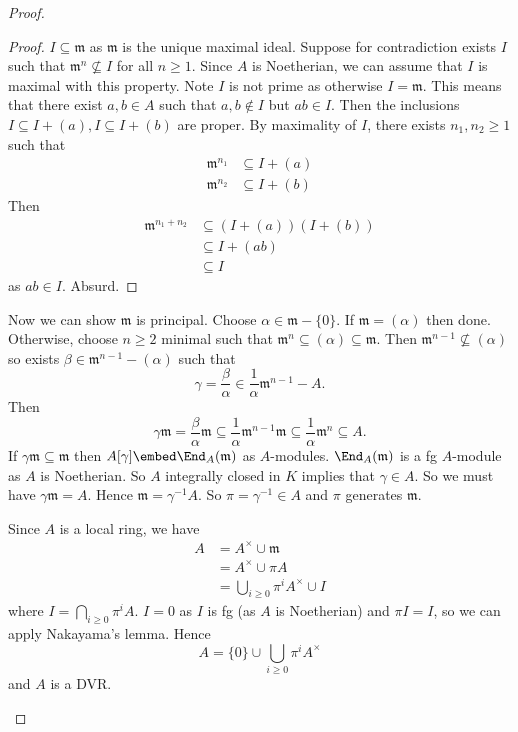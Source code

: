 \documentclass[a4paper]{article}
\begin{document}
\begin{proof}
\begin{itemize}
    \begin{proof}
      \(I \subseteq \mathfrak m\) as \(\mathfrak m\) is the unique maximal ideal. Suppose for contradiction exists \(I\) such that \(\mathfrak m^n \nsubseteq I\) for all \(n \geq 1\). Since \(A\) is Noetherian, we can assume that \(I\) is maximal with this property. Note \(I\) is not prime as otherwise \(I = \mathfrak m\). This means that there exist \(a, b \in A\) such that \(a, b \notin I\) but \(ab \in I\). Then the inclusions \(I \subseteq I + (a), I \subseteq I + (b)\) are proper. By maximality of \(I\), there exists \(n_1, n_2 \geq 1\) such that
      \begin{align*}
        \mathfrak m^{n_1} &\subseteq I + (a) \\
        \mathfrak m^{n_2} &\subseteq I + (b)
      \end{align*}
      Then
      \begin{align*}
        \mathfrak m^{n_1 + n_2} &\subseteq (I + (a)) (I + (b)) \\
                                &\subseteq I + (ab) \\
                                &\subseteq I
      \end{align*}
      as \(ab \in I\). Absurd.
    \end{proof}
    Now we can show \(\mathfrak m\) is principal. Choose \(\alpha \in \mathfrak m - \{0\}\). If \(\mathfrak m = (\alpha)\) then done. Otherwise, choose \(n \geq 2\) minimal such that \(\mathfrak m^n \subseteq (\alpha) \subseteq \mathfrak m\). Then \(\mathfrak m^{n - 1} \nsubseteq (\alpha)\) so exists \(\beta \in \mathfrak m^{n - 1} - (\alpha)\) such that
    \[
      \gamma = \frac{\beta}{\alpha} \in \frac{1}{\alpha} \mathfrak m^{n - 1} - A.
    \]
    Then
    \[
      \gamma \mathfrak m = \frac{\beta}{\alpha} \mathfrak m \subseteq \frac{1}{\alpha} \mathfrak m^{n - 1} \mathfrak m \subseteq \frac{1}{\alpha} \mathfrak m^n \subseteq A.
    \]
    If \(\gamma \mathfrak m \subseteq \mathfrak m\) then \(A[\gamma] \embed \End_A(\mathfrak m)\) as \(A\)-modules. \(\End_A(\mathfrak m)\) is a fg \(A\)-module as \(A\) is Noetherian. So \(A\) integrally closed in \(K\) implies that \(\gamma \in A\). So we must have \(\gamma \mathfrak m = A\). Hence \(\mathfrak m = \gamma^{-1} A\). So \(\pi = \gamma^{-1} \in A\) and \(\pi\) generates \(\mathfrak m\).

    Since \(A\) is a local ring, we have
    \begin{align*}
      A &= A^\times \cup \mathfrak m \\
        &= A^\times \cup \pi A \\
        &= \bigcup_{i \geq 0} \pi^i A^\times \cup I
    \end{align*}
    where \(I = \bigcap_{i \geq 0} \pi^i A\). \(I = 0\) as \(I\) is fg (as \(A\) is Noetherian) and \(\pi I = I\), so we can apply Nakayama's lemma. Hence
    \[
      A = \{0\} \cup \bigcup_{i \geq 0} \pi^iA^\times
    \]
    and \(A\) is a DVR.
  \end{itemize}
\end{proof}
\end{document}
